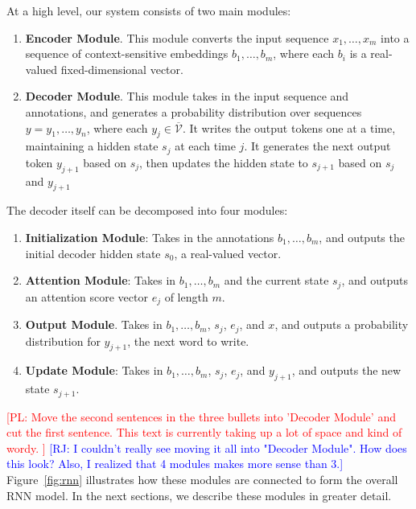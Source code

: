 \documentclass[11pt,letterpaper]{article}
\newcommand{\vocabout}{\overline{\mathcal{V}}}
\newcommand\pl[1]{\textcolor{red}{[PL: #1]}}
\newcommand\rj[1]{\textcolor{blue}{[RJ: #1]}}
\begin{document}
At a high level, our system consists of two main modules:
\begin{enumerate}
  \item \textbf{Encoder Module}.  This module 
    converts the input sequence $x_1, \dotsc, x_m$
    into a sequence of context-sensitive embeddings
    $b_1, \dotsc, b_m$,
    where each $b_i$ is a real-valued fixed-dimensional vector.
  \item \textbf{Decoder Module}.  This module
    takes in the input sequence and annotations,
    and generates a probability distribution
    over sequences $y = y_1, \dotsc, y_n$,
    where each $y_j \in \vocabout$.
    It writes the output tokens one at a time,
    maintaining a hidden state $s_j$ at each time $j$.
    It generates the next output token $y_{j+1}$ based on $s_j$,
    then updates the hidden state to $s_{j+1}$ based on
    $s_j$ and $y_{j+1}$
\end{enumerate}
The decoder itself can be decomposed into four modules:
\begin{enumerate}
  \item \textbf{Initialization Module}:
    Takes in the annotations $b_1, \dotsc, b_m$, and
    outputs the initial decoder hidden state $s_0$,
    a real-valued vector.
  \item \textbf{Attention Module}:
    Takes in $b_1, \dotsc, b_m$ and the current state $s_j$,
    and outputs an attention score vector $e_j$ of length $m$.
  \item \textbf{Output Module}.  
    Takes in $b_1, \dotsc, b_m$, $s_j$, $e_j$, and $x$,
    and outputs a probability distribution 
    for $y_{j+1}$, the next word to write.
  \item \textbf{Update Module}: 
    Takes in $b_1, \dotsc, b_m$, $s_j$, $e_j$, and $y_{j+1}$,
    and outputs the new state $s_{j+1}$.
\end{enumerate}
\pl{Move the second sentences in the three bullets into 'Decoder Module'
  and cut the first sentence.
  This text is currently taking up a lot of space and kind of wordy.
}
\rj{I couldn't really see moving it all into "Decoder Module".  How does this look?
Also, I realized that 4 modules makes more sense than 3.}
Figure~\ref{fig:rnn} illustrates how these modules are connected
to form the overall RNN model.
In the next sections, we describe these modules in greater detail.

\end{document}
